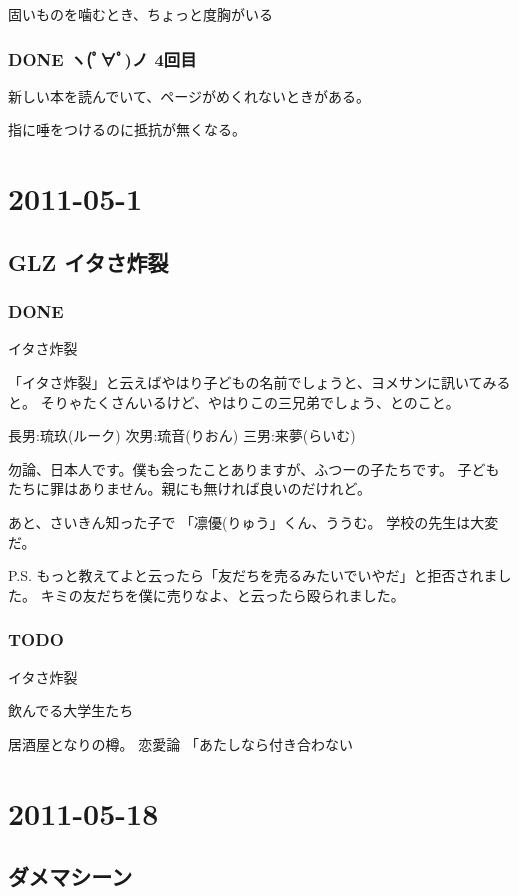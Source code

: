 \documentclass[11pt]{article}
\begin{document}
固いものを噛むとき、ちょっと度胸がいる
\subsubsection{\textbf{DONE} ヽ(ﾟ∀ﾟ)ノ 4回目}
\label{sec-120_2_3}

新しい本を読んでいて、ページがめくれないときがある。

指に唾をつけるのに抵抗が無くなる。
\section{2011-05-1}
\label{sec-121}
\subsection{GLZ イタさ炸裂}
\label{sec-121_1}
\subsubsection{\textbf{DONE}}
\label{sec-121_1_1}

イタさ炸裂

「イタさ炸裂」と云えばやはり子どもの名前でしょうと、ヨメサンに訊いてみると。
そりゃたくさんいるけど、やはりこの三兄弟でしょう、とのこと。

  長男:琉玖(ルーク)
  次男:琉音(りおん)
  三男:来夢(らいむ)

勿論、日本人です。僕も会ったことありますが、ふつーの子たちです。
子どもたちに罪はありません。親にも無ければ良いのだけれど。

あと、さいきん知った子で
「凛優(りゅう」くん、ううむ。
学校の先生は大変だ。

P.S.
もっと教えてよと云ったら「友だちを売るみたいでいやだ」と拒否されました。
キミの友だちを僕に売りなよ、と云ったら殴られました。
\subsubsection{\textbf{TODO}}
\label{sec-121_1_2}

イタさ炸裂

飲んでる大学生たち

居酒屋となりの樽。
恋愛論
「あたしなら付き合わない
\section{2011-05-18}
\label{sec-122}
\subsection{ダメマシーン}
\label{sec-122_1}
\end{document}
